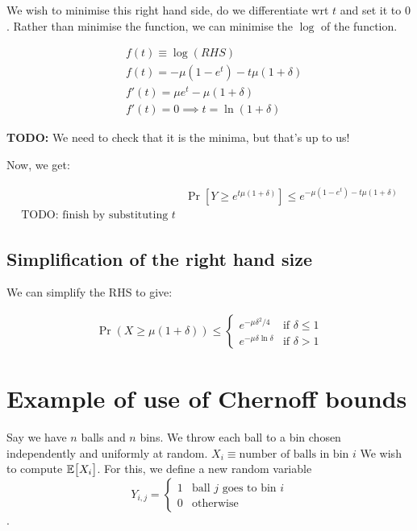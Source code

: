 We wish to minimise this right hand side, do we differentiate wrt $t$ and set
it to $0$.  Rather than minimise the function, we can minimise the $\log$ of
the function.

\begin{align*}
&f(t) \equiv \log (RHS) \\
&f(t) = -\mu(1 - e^t) - t\mu (1 + \delta) \\
& f'(t) = \mu e^t - \mu(1 + \delta) \\
& f'(t) = 0 \implies t = \ln (1 + \delta)
\end{align*}

\textbf{TODO:} We need to check that it is the minima, but that's up to us!

Now, we get:

\begin{align*}
&\Pr[Y \geq e^{t \mu (1 + \delta)}] \leq e^{-\mu (1 - e^t) - t\mu(1 + \delta)} \\
\text{TODO: finish by substituting $t$}
\end{align*}

\subsection{Simplification of the right hand size}

We can simplify the RHS to give:

\begin{align*}
\Pr(X \geq \mu(1 + \delta)) \leq
\begin{cases}
e^{-\mu \delta^2 / 4} & \text{if~$\delta \leq 1$} \\
e^{-\mu \delta \ln \delta} & \text{if~$\delta > 1$}
\end{cases}
\end{align*}

\section{Example of use of Chernoff bounds}

Say we have $n$ balls and $n$ bins. We throw each ball to a bin chosen
independently and uniformly at random. $X_i \equiv \text{number of balls in bin $i$}$
We wish to compute $\mathbb{E}\big[ X_i \big]$. For this, we define a new random variable
$$
Y_{i, j} = 
\begin{cases}
1 & \text{ball $j$ goes to bin $i$} \\
0 & \text{otherwise}
\end{cases}
$$.

